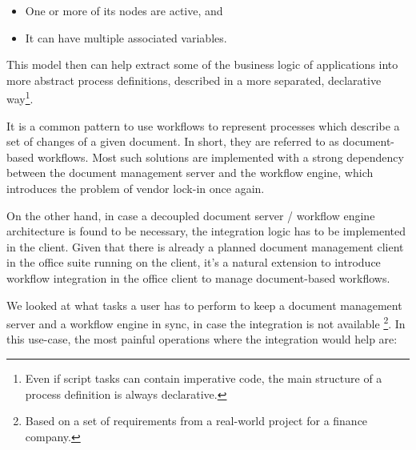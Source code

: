 \begin{itemize}
\item One or more of its nodes are active, and
\item It can have multiple associated variables.
\end{itemize}

This model then can help extract some of the business logic of applications
into more abstract process definitions, described in a more separated,
declarative way\footnote{Even if script tasks can contain imperative code, the
main structure of a process definition is always declarative.}.

It is a common pattern to use workflows to represent processes which describe a
set of changes of a given document. In short, they are referred to as
document-based workflows. Most such solutions are implemented with a strong
dependency between the document management server and the workflow engine,
which introduces the problem of vendor lock-in once again.

On the other hand, in case a decoupled document server / workflow engine
architecture is found to be necessary, the integration logic has to be implemented
in the client. Given that there is already a planned document management client
in the office suite running on the client, it's a natural extension to
introduce workflow integration in the office client to manage document-based
workflows.

We looked at what tasks a user has to perform to keep a document management
server and a workflow engine in sync, in case the integration is not available
\footnote{Based on a set of requirements from a real-world project for a
finance company.}.  In this use-case, the most painful operations where the
integration would help are:

